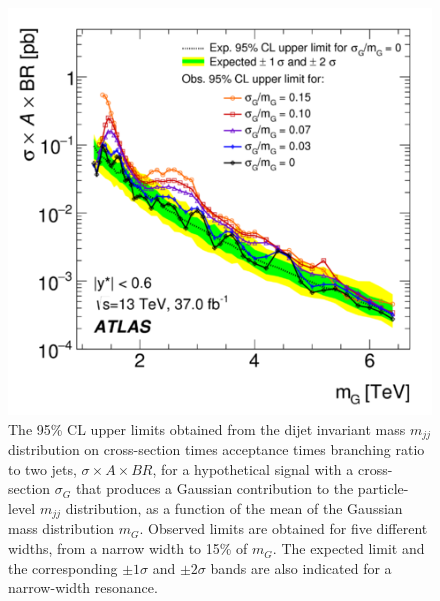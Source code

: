 \begin{figure}[]
	\centering
	\includegraphics[width=0.8\columnwidth]{figures/Results/GaussianLimit.png}
	\caption{The 95\% CL upper limits obtained from the dijet invariant mass $m_{jj}$ distribution on cross-section times acceptance times branching ratio to two jets, $\sigma \times A \times BR$, for a hypothetical signal with a cross-section $\sigma_G$ that produces a Gaussian contribution to the particle-level $m_{jj}$ distribution, as a function of the mean of the Gaussian mass distribution $m_G$. Observed limits are obtained for five different widths, from a narrow width to 15\% of $m_G$. The expected limit and the corresponding $\pm1\sigma$ and $\pm2\sigma$ bands are also indicated for a narrow-width resonance.
}
	\label{fig:GaussianLimit}
\end{figure}